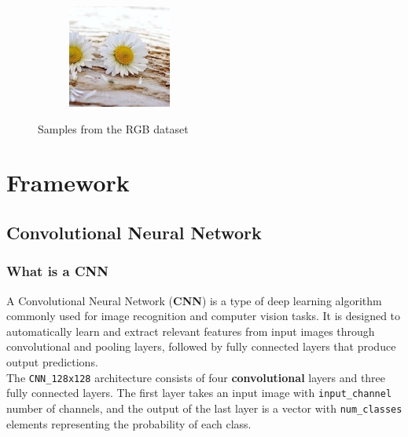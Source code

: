 \documentclass{report}
\begin{document}
\begin{figure}[h!]
\begin{subfigure}[t]{0.19\textwidth}
    \label{fig:dataset-sub4}
  \end{subfigure}
  \hfill
  \begin{subfigure}[t]{0.19\textwidth}
    \centering
    \includegraphics[width=\textwidth]{dataset/flower_4.jpg}
    \label{fig:dataset-sub5}
  \end{subfigure}

  \caption{Samples from the RGB dataset}
  \label{fig:dataset}
\end{figure}


\chapter{Framework}
\section{Convolutional Neural Network}
\subsection{What is a CNN}
A Convolutional Neural Network (\textbf{CNN}) is a type of deep learning algorithm commonly used for image recognition and computer vision tasks. It is designed to automatically learn and extract relevant features from input images through convolutional and pooling layers, followed by fully connected layers that produce output predictions. \\
The \texttt{CNN\_128x128} architecture consists of four \textbf{convolutional} layers and three fully connected layers. The first layer takes an input image with \texttt{input\_channel} number of channels, and the output of the last layer is a vector with \texttt{num\_classes} elements representing the probability of each class.
\end{document}
